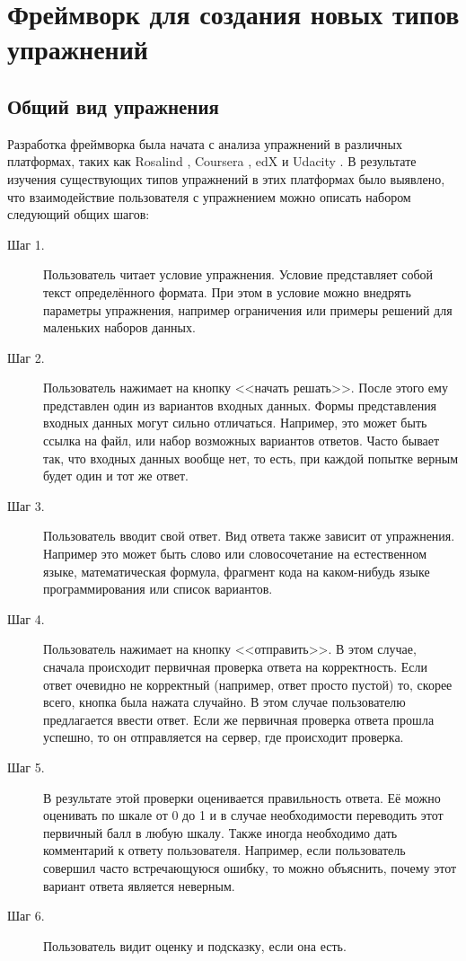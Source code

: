 \documentclass{matmex-diploma-custom}
\begin{document}
\section{Фреймворк для создания новых типов упражнений}

\subsection{Общий вид упражнения}
Разработка фреймворка была начата с анализа упражнений в различных
платформах, таких как Rosalind \cite{rosalind}, Coursera
\cite{coursera}, edX \cite{edx} и Udacity \cite{udacity}. В результате
изучения существующих типов упражнений в этих платформах было
выявлено, что взаимодействие пользователя с упражнением можно описать
набором следующий общих шагов:

\begin{description}
\item[Шаг 1.] Пользователь читает условие упражнения. Условие
  представляет собой текст определённого формата. При этом в условие
  можно внедрять параметры упражнения, например ограничения или
  примеры решений для маленьких наборов данных.

\item[Шаг 2.] Пользователь нажимает на кнопку <<начать решать>>.
  После этого ему представлен один из вариантов входных данных. Формы
  представления входных данных могут сильно отличаться. Например, это
  может быть ссылка на файл, или набор возможных вариантов
  ответов. Часто бывает так, что входных данных вообще нет, то есть,
  при каждой попытке верным будет один и тот же ответ.
\item[Шаг 3.] Пользователь вводит свой ответ. Вид ответа также зависит
  от упражнения. Например это может быть слово или словосочетание на
  естественном языке, математическая формула, фрагмент кода на
  каком-нибудь языке программирования или список вариантов.
\item[Шаг 4.] Пользователь нажимает на кнопку <<отправить>>. В этом
  случае, сначала происходит первичная проверка ответа на
  корректность. Если ответ очевидно не корректный (например, ответ
  просто пустой) то, скорее всего, кнопка была нажата случайно. В этом
  случае пользователю предлагается ввести ответ. Если же первичная
  проверка ответа прошла успешно, то он отправляется на сервер, где
  происходит проверка.
\item[Шаг 5.] В результате этой проверки оценивается правильность
  ответа. Её можно оценивать по шкале от 0 до 1 и в случае
  необходимости переводить этот первичный балл в любую шкалу. Также
  иногда необходимо дать комментарий к ответу пользователя. Например,
  если пользователь совершил часто встречающуюся ошибку, то можно
  объяснить, почему этот вариант ответа является неверным.
\item[Шаг 6.] Пользователь видит оценку и подсказку, если она есть.
\end{description}
\end{document}
